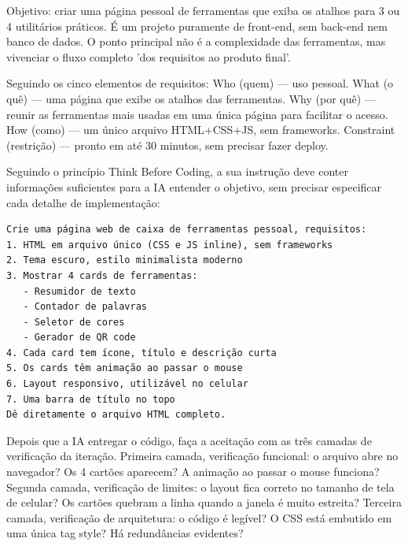 



Objetivo: criar uma página pessoal de ferramentas que exiba os atalhos para 3 ou 4 utilitários práticos. É um projeto puramente de front-end, sem back-end nem banco de dados. O ponto principal não é a complexidade das ferramentas, mas vivenciar o fluxo completo 'dos requisitos ao produto final'.

Seguindo os cinco elementos de requisitos: Who (quem) — uso pessoal. What (o quê) — uma página que exibe os atalhos das ferramentas. Why (por quê) — reunir as ferramentas mais usadas em uma única página para facilitar o acesso. How (como) — um único arquivo HTML+CSS+JS, sem frameworks. Constraint (restrição) — pronto em até 30 minutos, sem precisar fazer deploy.


Seguindo o princípio Think Before Coding, a sua instrução deve conter informações suficientes para a IA entender o objetivo, sem precisar especificar cada detalhe de implementação:

\begin{lstlisting}
Crie uma página web de caixa de ferramentas pessoal, requisitos:
1. HTML em arquivo único (CSS e JS inline), sem frameworks
2. Tema escuro, estilo minimalista moderno
3. Mostrar 4 cards de ferramentas:
   - Resumidor de texto
   - Contador de palavras
   - Seletor de cores
   - Gerador de QR code
4. Cada card tem ícone, título e descrição curta
5. Os cards têm animação ao passar o mouse
6. Layout responsivo, utilizável no celular
7. Uma barra de título no topo
Dê diretamente o arquivo HTML completo.
\end{lstlisting}


Depois que a IA entregar o código, faça a aceitação com as três camadas de verificação da iteração. Primeira camada, verificação funcional: o arquivo abre no navegador? Os 4 cartões aparecem? A animação ao passar o mouse funciona? Segunda camada, verificação de limites: o layout fica correto no tamanho de tela de celular? Os cartões quebram a linha quando a janela é muito estreita? Terceira camada, verificação de arquitetura: o código é legível? O CSS está embutido em uma única tag style? Há redundâncias evidentes?

